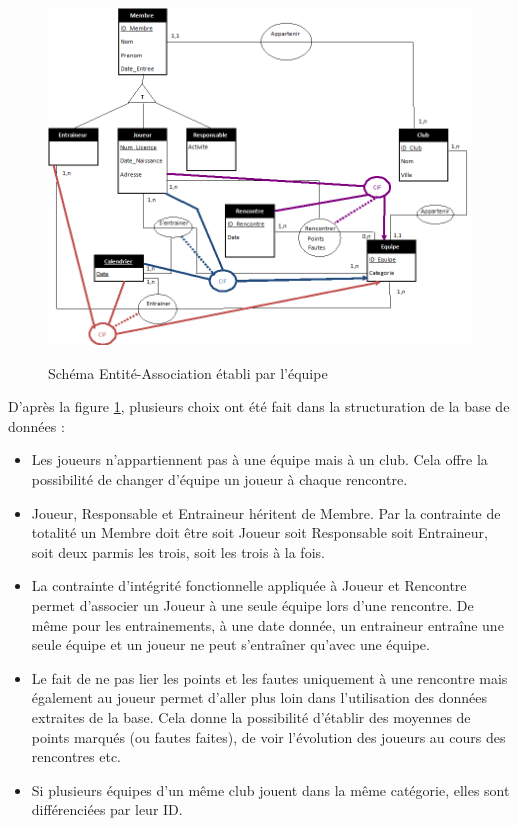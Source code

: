 \documentclass[a4paper,8pt,french,fleqn]{report}
\begin{document}
\begin{figure}[h]
  \centering
    \includegraphics[scale=0.5]{Schema_EA.png}
    \label{fig:schema_ea}
    \caption{Schéma Entité-Association établi par l'équipe}
\end{figure}

D'après la figure \ref{fig:schema_ea}, plusieurs choix ont été fait dans la structuration de la base de données : \\

\begin{itemize}

\item Les joueurs n'appartiennent pas à une équipe mais à un club. Cela offre la possibilité de changer d'équipe un joueur à chaque rencontre. \\

\item Joueur, Responsable et Entraineur héritent de Membre. Par la contrainte de totalité un Membre doit être soit Joueur soit Responsable soit Entraineur, soit deux parmis les trois, soit les trois à la fois.\\

\item La contrainte d'intégrité fonctionnelle appliquée à Joueur et Rencontre permet d'associer un Joueur à une seule équipe lors d'une rencontre. De même pour les entrainements, à une date donnée, un entraineur entraîne une seule équipe et un joueur ne peut s'entraîner qu'avec une équipe. \\

\item Le fait de ne pas lier les points et les fautes uniquement à une rencontre mais également au joueur permet d'aller plus loin dans l'utilisation des données extraites de la base. Cela donne la possibilité d'établir des moyennes de points marqués (ou fautes faites), de voir l'évolution des joueurs au cours des rencontres etc. \\

\item Si plusieurs équipes d'un même club jouent dans la même catégorie, elles sont différenciées par leur ID.

\end{itemize}
\end{document}
